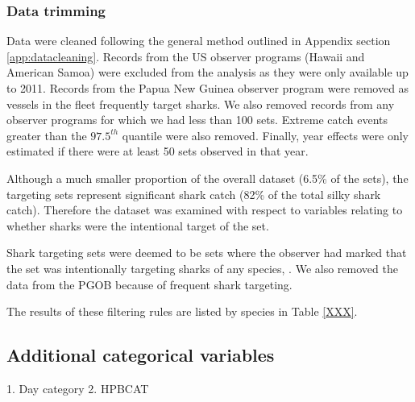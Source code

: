 \subsubsection{Data trimming}
Data were cleaned following the general method outlined in Appendix section \ref{app:datacleaning}. Records from the US observer programs (Hawaii and American Samoa) were excluded from the analysis as they were only available up to 2011. Records from the Papua New Guinea observer program were removed as vessels in the fleet frequently target sharks. We also removed records from any observer programs for which we had less than 100 sets. Extreme catch events greater than the $97.5^{th}$ quantile were also removed. Finally, year effects were only estimated if there were at least 50 sets observed in that year.

Although a much smaller proportion of the overall dataset (6.5\% of the sets), the targeting sets represent significant shark catch (82\% of the total silky shark catch). Therefore the dataset was examined with respect to variables relating to whether sharks were the intentional target of the set. 

Shark targeting sets were deemed to be sets where the observer had marked that the set was intentionally targeting sharks of any species, . We also removed the data from the PGOB because of frequent shark targeting. 

The results of these filtering rules are listed by species in Table \ref{XXX}.

\subsection{Additional categorical variables}
1. Day category
2. HPBCAT

